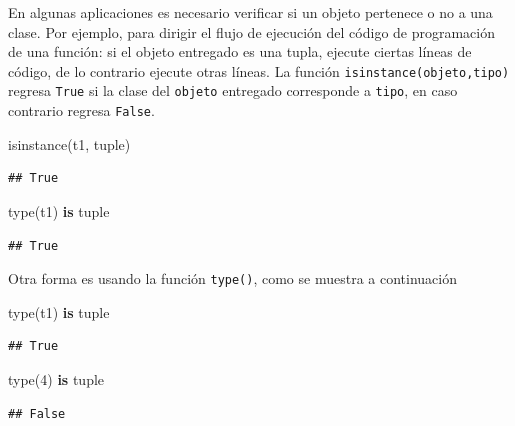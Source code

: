 \documentclass[
]{book}
\newenvironment{Shaded}{\begin{snugshade}}{\end{snugshade}}
\newcommand{\BuiltInTok}[1]{#1}
\newcommand{\DecValTok}[1]{\textcolor[rgb]{0.00,0.00,0.81}{#1}}
\newcommand{\KeywordTok}[1]{\textcolor[rgb]{0.13,0.29,0.53}{\textbf{#1}}}
\newcommand{\NormalTok}[1]{#1}
\theoremstyle{definition}
\theoremstyle{definition}
\theoremstyle{definition}
\theoremstyle{definition}
\theoremstyle{remark}
\begin{document}
En algunas aplicaciones es necesario verificar si un objeto pertenece o no a una clase. Por ejemplo, para dirigir el flujo de ejecución del código de programación de una función: si el objeto entregado es una tupla, ejecute ciertas líneas de código, de lo contrario ejecute otras líneas. La función \texttt{isinstance(objeto,tipo)} regresa \texttt{True} si la clase del \texttt{objeto} entregado corresponde a \texttt{tipo}, en caso contrario regresa \texttt{False}.

\begin{Shaded}
\begin{Highlighting}[]
\BuiltInTok{isinstance}\NormalTok{(t1, }\BuiltInTok{tuple}\NormalTok{)}
\end{Highlighting}
\end{Shaded}

\begin{verbatim}
## True
\end{verbatim}

\begin{Shaded}
\begin{Highlighting}[]
\BuiltInTok{type}\NormalTok{(t1) }\KeywordTok{is} \BuiltInTok{tuple}
\end{Highlighting}
\end{Shaded}

\begin{verbatim}
## True
\end{verbatim}

Otra forma es usando la función \texttt{type()}, como se muestra a continuación

\begin{Shaded}
\begin{Highlighting}[]
\BuiltInTok{type}\NormalTok{(t1) }\KeywordTok{is} \BuiltInTok{tuple}
\end{Highlighting}
\end{Shaded}

\begin{verbatim}
## True
\end{verbatim}

\begin{Shaded}
\begin{Highlighting}[]
\BuiltInTok{type}\NormalTok{(}\DecValTok{4}\NormalTok{) }\KeywordTok{is} \BuiltInTok{tuple}
\end{Highlighting}
\end{Shaded}

\begin{verbatim}
## False
\end{verbatim}
\end{document}
